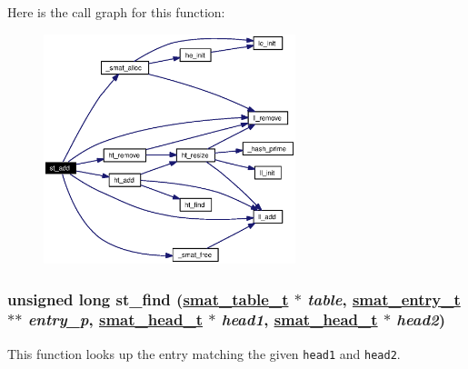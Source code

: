 Here is the call graph for this function:\begin{figure}[H]
\begin{center}
\leavevmode
\includegraphics[width=208pt]{group__dbprim__smat_ga13_cgraph}
\end{center}
\end{figure}
\hypertarget{group__dbprim__smat_ga15}{
\subsubsection[st\_\-find]{\setlength{\rightskip}{0pt plus 5cm}unsigned long st\_\-find (\hyperlink{struct__smat__table__s}{smat\_\-table\_\-t} $\ast$ {\em table}, \hyperlink{struct__smat__entry__s}{smat\_\-entry\_\-t} $\ast$$\ast$ {\em entry\_\-p}, \hyperlink{struct__smat__head__s}{smat\_\-head\_\-t} $\ast$ {\em head1}, \hyperlink{struct__smat__head__s}{smat\_\-head\_\-t} $\ast$ {\em head2})}}
\label{group__dbprim__smat_ga15}


This function looks up the entry matching the given {\tt head1} and {\tt head2}.

